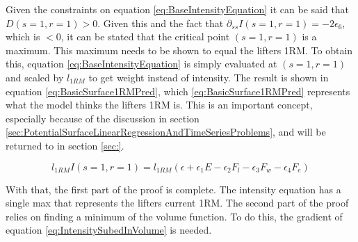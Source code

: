 Given the constraints on equation \ref{eq:BaseIntensityEquation} it can be said that $D(s=1,r=1)>0$. Given this and the fact that $\partial_{ss}I(s=1,r=1)=-2\epsilon_6$, which is $<0$, it can be stated that the critical point $(s=1,r=1)$ is a maximum. This maximum needs to be shown to equal the lifters 1RM. To obtain this, equation \ref{eq:BaseIntensityEquation} is simply evaluated at $(s=1,r=1)$ and scaled by $l_{1RM}$ to get weight instead of intensity. The result is shown in equation \ref{eq:BasicSurface1RMPred}, which \ref{eq:BasicSurface1RMPred} represents what the model thinks the lifters 1RM is. This is an important concept, especially because of the discussion in section \ref{sec:PotentialSurfaceLinearRegressionAndTimeSeriesProblems}, and will be returned to in section \ref{sec:}.

\begin{equation}
	\label{eq:BasicSurface1RMPred}
	l_{1RM} I(s=1,r=1)=l_{1RM} \left(
		\epsilon+
    		\epsilon_1 E-
    		\epsilon_2 F_l-
    		\epsilon_3 F_w-
    		\epsilon_4 F_e
    	\right)
\end{equation}

With that, the first part of the proof is complete. The intensity equation has a single max that represents the lifters current 1RM. The second part of the proof relies on finding a minimum of the volume function. To do this, the gradient of equation \ref{eq:IntensitySubedInVolume} is needed.

